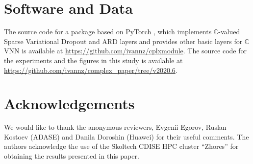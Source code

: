 \documentclass{article}
\newcommand{\cplx}{\mathbb{C}}
\begin{document}

\section*{Software and Data} %
\label{sec:software_and_data}


The source code for a package based on PyTorch \citep{paszke_pytorch_2019}, which
implements $\cplx$-valued Sparse Variational Dropout and ARD layers and provides other
basic layers for $\cplx$VNN is available at
\url{https://github.com/ivannz/cplxmodule}.
%
The source code for the experiments and the figures in this study is available at
\url{https://github.com/ivannz/complex_paper/tree/v2020.6}.


\section*{Acknowledgements} %
\label{sec:acknowledgements}


We would like to thank the anonymous reviewers, Evgenii Egorov, Ruslan Kostoev (ADASE)
and Danila Doroshin (Huawei) for their useful comments.
The authors acknowledge the use of the Skoltech CDISE HPC cluster ``Zhores'' for obtaining
the results presented in this paper.





\end{document}
